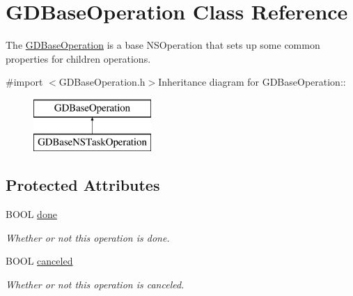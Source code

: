 \hypertarget{interface_g_d_base_operation}{
\section{GDBaseOperation Class Reference}
\label{interface_g_d_base_operation}
}


The \hyperlink{interface_g_d_base_operation}{GDBaseOperation} is a base NSOperation that sets up some common properties for children operations.  


{\ttfamily \#import $<$GDBaseOperation.h$>$}Inheritance diagram for GDBaseOperation::\begin{figure}[H]
\begin{center}
\leavevmode
\includegraphics[height=2cm]{interface_g_d_base_operation}
\end{center}
\end{figure}
\subsection*{Protected Attributes}
\begin{DoxyCompactItemize}
\item 
\hypertarget{interface_g_d_base_operation_ad31ede5ba4937dcf61b7093f4c9bbb84}{
BOOL \hyperlink{interface_g_d_base_operation_ad31ede5ba4937dcf61b7093f4c9bbb84}{done}}
\label{interface_g_d_base_operation_ad31ede5ba4937dcf61b7093f4c9bbb84}

\begin{DoxyCompactList}\small\item\em Whether or not this operation is done. \item\end{DoxyCompactList}\item 
\hypertarget{interface_g_d_base_operation_affa9ae27043a84effe3cde90571d8cb4}{
BOOL \hyperlink{interface_g_d_base_operation_affa9ae27043a84effe3cde90571d8cb4}{canceled}}
\label{interface_g_d_base_operation_affa9ae27043a84effe3cde90571d8cb4}

\begin{DoxyCompactList}\small\item\em Whether or not this operation is canceled. \item\end{DoxyCompactList}\end{DoxyCompactItemize}
